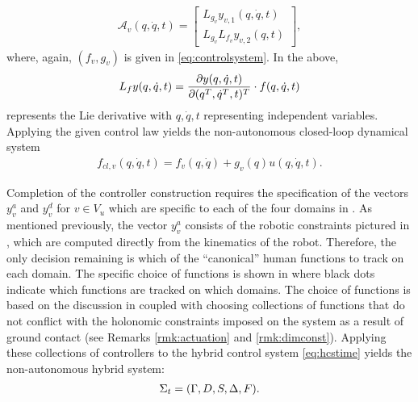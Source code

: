 \begin{align*}
  \mathcal{A}_{v}(q, {\dot q},t) =
  \left[\begin{array}{c}
      L_{g_{v}} y_{v,1} (q, {\dot q}, t)\\
      L_{g_{v}} L_{f_{v}} y_{v,2}(q,t)
    \end{array}\right],
\end{align*}
where, again, $(f_{v},g_{v})$ is given in \eqref{eq:controlsystem}.
%
In the above,
\begin{align}
  L_{f} y(q, {\dot q}, t) = \frac{\partial{y(q, {\dot q}, t)}}{\partial{(q^T, {\dot q}^T, t)^T}} \cdot f(q, \dot q, t)
\end{align}
represents the Lie derivative with $q, {\dot q}, t$ representing independent
variables.
Applying the given control law yields the non-autonomous closed-loop dynamical
system
\begin{align}
  \label{eq:clsys}
  f_\mathit{cl,v}(q, {\dot q},t) = f_v(q, {\dot q}) + g_v(q) u(q, {\dot q}, t).
\end{align}

Completion of the controller construction requires the specification of the
vectors $y^{a}_{v}$ and $y^{d}_{v}$ for $v \in V_u$ which are specific to each
of the four domains in .
%
As mentioned previously, the vector $y^a_v$ consists of the robotic constraints
pictured in , which are computed directly from the
kinematics of the robot.
%
Therefore, the only decision remaining is which of the ``canonical'' human
functions to track on each domain.
%
The specific choice of functions is shown in  where black
dots indicate which functions are tracked on which domains.
%
The choice of functions is based on the discussion in 
coupled with choosing collections of functions that do not conflict with the
holonomic constraints imposed on the system as a result of ground contact (see
Remarks \ref{rmk:actuation} and \ref{rmk:dimconst}).
%
Applying these collections of controllers to the hybrid control system
\eqref{eq:hcstime} yields the non-autonomous hybrid system:
%
\begin{align}
  \label{eq:hstime}
  \Sigma_t = (\Gamma, D, S, \Delta, F).
\end{align}

